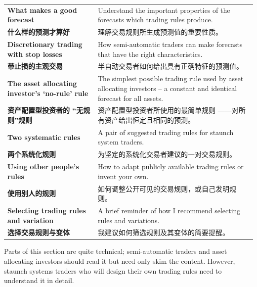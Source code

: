\begin{bilingualtableblock} \begin{tabularx}{\textwidth}{@{} L{0.30\textwidth} Y@{}}\textbf{What makes a good forecast} & Understand the important properties of the forecasts which trading rules produce. \\

\textbf{什么样的预测才算好} & 理解交易规则所生成预测值的重要性质。 \\
\textbf{Discretionary trading with stop losses} & How semi-automatic traders can make forecasts that have the right characteristics. \\
\textbf{带止损的主观交易} & 半自动交易者如何给出具有正确特征的预测值。 \\
\textbf{The asset allocating investor’s ‘no-rule’ rule} & The simplest possible trading rule used by asset allocating investors – a constant and identical forecast for all assets. \\
\textbf{资产配置型投资者的 “无规则”规则} & 资产配置型投资者所使用的最简单规则 ——对所有资产给出恒定且相同的预测。 \\
\textbf{Two systematic rules} & A pair of suggested trading rules for staunch system traders. \\
\textbf{两个系统化规则} & 为坚定的系统化交易者建议的一对交易规则。 \\
\textbf{Using other people’s rules} & How to adapt publicly available trading rules or invent your own. \\
\textbf{使用别人的规则} & 如何调整公开可见的交易规则，或自己发明规则。 \\
\textbf{Selecting trading rules and variation} & A brief reminder of how I recommend selecting rules and variations. \\
\textbf{选择交易规则与变体} & 我建议如何筛选规则及其变体的简要提醒。 \\
\end{tabularx}
\end{bilingualtableblock}


\begin{englishblock} Parts of this section are quite technical; semi-automatic traders and asset allocating investors should read it but need only skim the content. However, staunch systems traders who will design their own trading rules need to understand it in detail. \end{englishblock}

